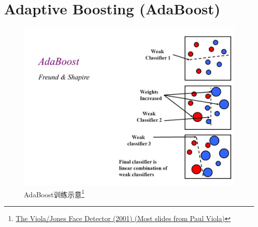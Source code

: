 
\section{Adaptive Boosting (AdaBoost)}

\begin{frame}
    \begin{figure}[!tb]
        \includegraphics[width=\onepicwidth]{figure/adaboost/adaboost}
        \caption{AdaBoost训练示意\footnote{
                 \href{http://slideplayer.com/slide/4816467/}{The Viola/Jones Face Detector (2001) (Most slides from Paul Viola)}}}
    \end{figure}
\end{frame}
